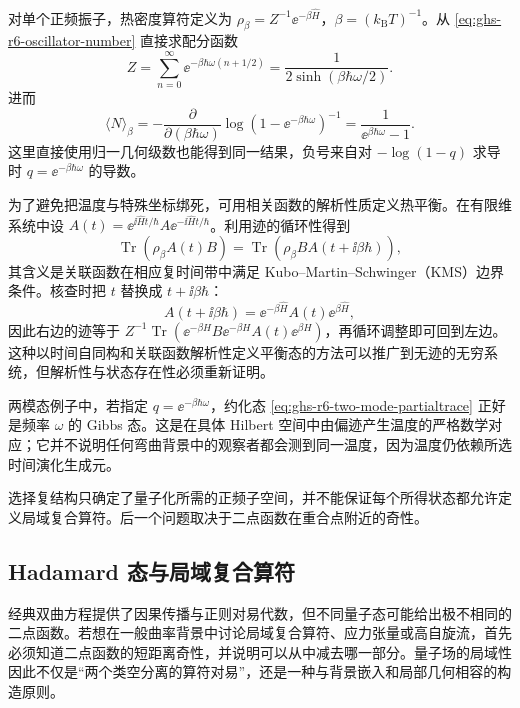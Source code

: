 \begin{example}[振子的热谱与配分函数]
对单个正频振子，热密度算符定义为 $\rho_\beta=Z^{-1}\ee^{-\beta\widehat H}$，$\beta=(k_{\mathrm B}T)^{-1}$。从 \cref{eq:ghs-r6-oscillator-number} 直接求配分函数
\begin{equation}\label{eq:ghs-r6-oscillator-partition}
Z=\sum_{n=0}^\infty\ee^{-\beta\hbar\omega(n+1/2)}
=\frac{1}{2\sinh(\beta\hbar\omega/2)}.
\end{equation}
进而
\[
\langle N\rangle_\beta=-\frac{\partial}{\partial(\beta\hbar\omega)}
\log(1-\ee^{-\beta\hbar\omega})^{-1}
=\frac{1}{\ee^{\beta\hbar\omega}-1}.
\]
这里直接使用归一几何级数也能得到同一结果，负号来自对 $-\log(1-q)$ 求导时 $q=\ee^{-\beta\hbar\omega}$ 的导数。
\end{example}

为了避免把温度与特殊坐标绑死，可用相关函数的解析性质定义热平衡。在有限维系统中设 $A(t)=\ee^{\ii\widehat Ht/\hbar}A\ee^{-\ii\widehat Ht/\hbar}$。利用迹的循环性得到
\[
\operatorname{Tr}(\rho_\beta A(t)B)
=\operatorname{Tr}(\rho_\beta B A(t+\ii\beta\hbar)),
\]
其含义是关联函数在相应复时间带中满足 Kubo--Martin--Schwinger（KMS）边界条件。核查时把 $t$ 替换成 $t+\ii\beta\hbar$：
\[
A(t+\ii\beta\hbar)=\ee^{-\beta\widehat H}A(t)\ee^{\beta\widehat H},
\]
因此右边的迹等于 $Z^{-1}\operatorname{Tr}(\ee^{-\beta H}B\ee^{-\beta H}A(t)\ee^{\beta H})$，再循环调整即可回到左边。这种以时间自同构和关联函数解析性定义平衡态的方法可以推广到无迹的无穷系统，但解析性与状态存在性必须重新证明。

两模态例子中，若指定 $q=\ee^{-\beta\hbar\omega}$，约化态 \cref{eq:ghs-r6-two-mode-partialtrace} 正好是频率 $\omega$ 的 Gibbs 态。这是在具体 Hilbert 空间中由偏迹产生温度的严格数学对应；它并不说明任何弯曲背景中的观察者都会测到同一温度，因为温度仍依赖所选时间演化生成元。


选择复结构只确定了量子化所需的正频子空间，并不能保证每个所得状态都允许定义局域复合算符。后一个问题取决于二点函数在重合点附近的奇性。


\subsection{Hadamard 态与局域复合算符}

经典双曲方程提供了因果传播与正则对易代数，但不同量子态可能给出极不相同的二点函数。若想在一般曲率背景中讨论局域复合算符、应力张量或高自旋流，首先必须知道二点函数的短距离奇性，并说明可以从中减去哪一部分。量子场的局域性因此不仅是“两个类空分离的算符对易”，还是一种与背景嵌入和局部几何相容的构造原则。


